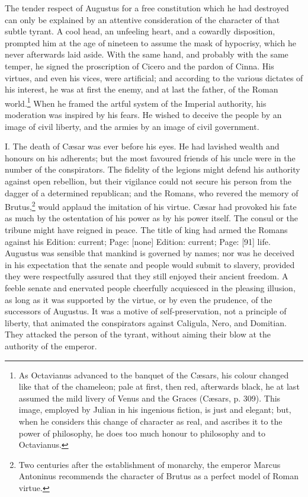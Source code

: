The tender respect of Augustus for a free constitution which he had destroyed can only be explained by an attentive consideration of the character of that subtle tyrant. A cool head, an unfeeling heart, and a cowardly disposition, prompted him at the age of nineteen to assume the mask of hypocrisy, which he never afterwards laid aside. With the same hand, and probably with the same temper, he signed the proscription of Cicero and the pardon of Cinna. His virtues, and even his vices, were artificial; and according to the various dictates of his interest, he was at first the enemy, and at last the father, of the Roman world.\footnote{As Octavianus advanced to the banquet of the Cæsars, his colour changed like that of the chameleon; pale at first, then red, afterwards black, he at last assumed the mild livery of Venus and the Graces (Cæsars, p. 309). This image, employed by Julian in his ingenious fiction, is just and elegant; but, when he considers this change of character as real, and ascribes it to the power of philosophy, he does too much honour to philosophy and to Octavianus.} When he framed the artful system of the Imperial authority, his moderation was inspired by his fears. He wished to deceive the people by an image of civil liberty, and the armies by an image of civil government.

I. The death of Cæsar was ever before his eyes. He had lavished wealth and honours on his adherents; but the most favoured friends of his uncle were in the number of the conspirators. The fidelity of the legions might defend his authority against open rebellion, but their vigilance could not secure his person from the dagger of a determined republican; and the Romans, who revered the memory of Brutus,\footnote{Two centuries after the establishment of monarchy, the emperor Marcus Antoninus recommends the character of Brutus as a perfect model of Roman virtue.} would applaud the imitation of his virtue. Cæsar had provoked his fate as much by the ostentation of his power as by his power itself. The consul or the tribune might have reigned in peace. The title of king had armed the Romans against his Edition: current; Page: [none] Edition: current; Page: [91] life. Augustus was sensible that mankind is governed by names; nor was he deceived in his expectation that the senate and people would submit to slavery, provided they were respectfully assured that they still enjoyed their ancient freedom. A feeble senate and enervated people cheerfully acquiesced in the pleasing illusion, as long as it was supported by the virtue, or by even the prudence, of the successors of Augustus. It was a motive of self-preservation, not a principle of liberty, that animated the conspirators against Caligula, Nero, and Domitian. They attacked the person of the tyrant, without aiming their blow at the authority of the emperor.

